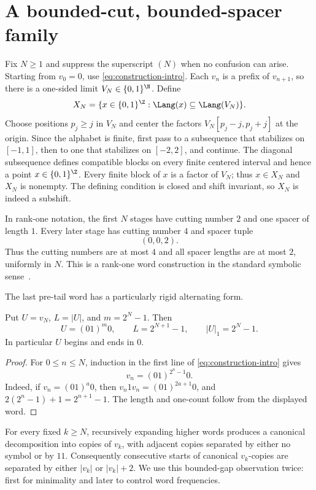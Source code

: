 \section{A bounded-cut, bounded-spacer family}

Fix $N\geq1$ and suppress the superscript $(N)$ when no confusion can arise.
Starting from $v_0=0$, use \eqref{eq:construction-intro}.  Each $v_n$ is a
prefix of $v_{n+1}$, so there is a one-sided limit
$V_N\in\{0,1\}^{\N}$.  Define
\begin{equation}\label{eq:XN-definition}
 X_N=\{x\in\{0,1\}^{\Z}:\Lang(x)\subseteq\Lang(V_N)\}.
\end{equation}
Choose positions $p_j\geq j$ in $V_N$ and center the factors
$V_N[p_j-j,p_j+j]$ at the origin.  Since the alphabet is finite, first pass to
a subsequence that stabilizes on $[-1,1]$, then to one that stabilizes on
$[-2,2]$, and continue.  The diagonal subsequence defines compatible blocks
on every finite centered interval and hence a point
$x\in\{0,1\}^{\Z}$.  Every finite block of $x$ is a factor of $V_N$; thus
$x\in X_N$ and $X_N$ is nonempty.  The defining condition is closed and shift
invariant, so $X_N$ is indeed a subshift.

In rank-one notation, the first $N$ stages have cutting number $2$ and one
spacer of length $1$.  Every later stage has cutting number $4$ and spacer
tuple
\[
 (0,0,2).
\]
Thus the cutting numbers are at most $4$ and all spacer lengths are at most
$2$, uniformly in $N$.  This is a rank-one word construction in the standard
symbolic sense~\cite{GaoHill2016,GaoEtAl2025}.

The last pre-tail word has a particularly rigid alternating form.

\begin{lemma}\label{lem:alternating}
Put $U=v_N$, $L=|U|$, and $m=2^N-1$.  Then
\begin{equation}\label{eq:U-form}
 U=(01)^m0,\qquad L=2^{N+1}-1,\qquad |U|_1=2^N-1.
\end{equation}
In particular $U$ begins and ends in $0$.
\end{lemma}

\begin{proof}
For $0\leq n\leq N$, induction in the first line of
\eqref{eq:construction-intro} gives
\[
 v_n=(01)^{2^n-1}0.
\]
Indeed, if $v_n=(01)^a0$, then
$v_n1v_n=(01)^{2a+1}0$, and $2(2^n-1)+1=2^{n+1}-1$.
The length and one-count follow from the displayed word.
\end{proof}

For every fixed $k\geq N$, recursively expanding higher words produces a
canonical decomposition into copies of $v_k$, with adjacent copies separated
by either no symbol or by $11$.  Consequently consecutive starts of canonical
$v_k$-copies are separated by either $|v_k|$ or $|v_k|+2$.  We use this
bounded-gap observation twice: first for minimality and later to control word
frequencies.
